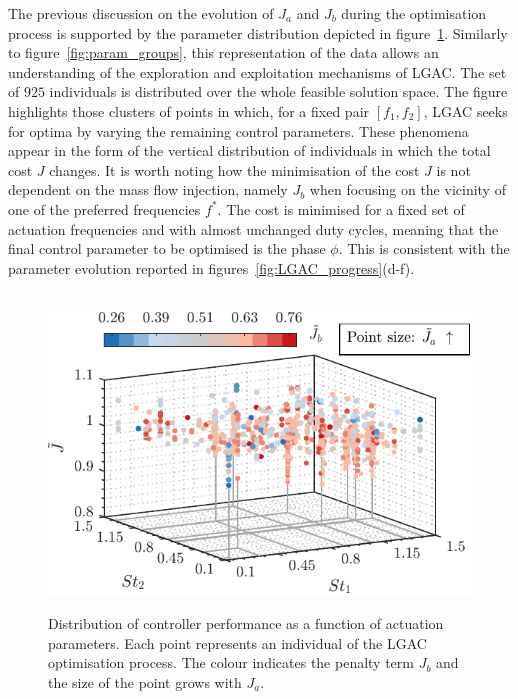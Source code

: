 The previous discussion on the evolution of $J_a$ and $J_b$ during the optimisation process is supported by the parameter distribution depicted in figure~\ref{fig:param_interpretation}. Similarly to figure~\ref{fig:param_groups}, this representation of the data allows an understanding of the exploration and exploitation mechanisms of LGAC. The set of $925$ individuals is distributed over the whole feasible solution space. The figure highlights those clusters of points in which, for a fixed pair $[f_1,f_2]$, LGAC seeks for optima by varying the remaining control parameters. These phenomena appear in the form of the vertical distribution of individuals in which the total cost $J$ changes. It is worth noting how the minimisation of the cost $J$ is not dependent on the mass flow injection, namely $J_b$ when focusing on the vicinity of one of the preferred frequencies $f^*$. The cost is minimised for a fixed set of actuation frequencies and with almost unchanged duty cycles, meaning that the final control parameter to be optimised is the phase $\phi$. This is consistent with the parameter evolution reported in figures~\ref{fig:LGAC_progress}(d-f).

\begin{figure}[t] %
    \centering\
    \includegraphics[width=0.75\linewidth]{figures/F8.pdf}
    \caption{Distribution of controller performance as a function of actuation parameters. Each point represents an individual of the LGAC optimisation process. The colour indicates the penalty term $J_b$ and the size of the point grows with $J_a$.}
    \label{fig:param_interpretation}
\end{figure}

